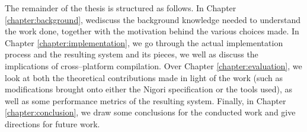 The remainder of the thesis is structured as follows.
In Chapter \ref{chapter:background}, wediscuss the background knowledge needed to understand the work done, together with the motivation behind the various choices made.
In Chapter \ref{chapter:implementation}, we go through the actual implementation process and the resulting system and its pieces, we well as discuss the implications of cross--platform compilation.
Over Chapter \ref{chapter:evaluation}, we look at both the theoretical contributions made in light of the work (such as modifications brought onto either the Nigori specification or the tools used), as well as some performance metrics of the resulting system.
Finally, in Chapter \ref{chapter:conclusion}, we draw some conclusions for the conducted work and give directions for future work.
